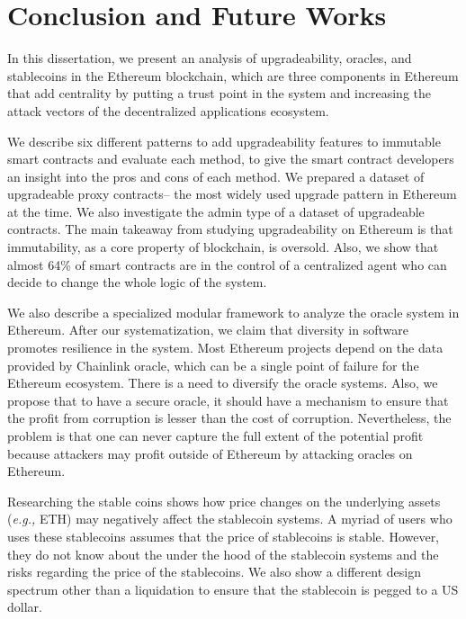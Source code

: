 \documentclass[letterpaper,12pt,onecolumn,final]{report}
\newcommand{\eg}{\textit{e.g.,}\xspace}
\begin{document}









\chapter{Conclusion and Future Works}
\label{chap:conclusion}

In this dissertation, we present an analysis of upgradeability, oracles, and stablecoins in the Ethereum blockchain, which are three components in Ethereum that add centrality by putting a trust point in the system and increasing the attack vectors of the decentralized applications ecosystem.

We describe six different patterns to add upgradeability features to immutable smart contracts and evaluate each method, to give the smart contract developers an insight into the pros and cons of each method. We prepared a dataset of upgradeable proxy contracts-- the most widely used upgrade pattern in Ethereum at the time. We also investigate the admin type of a dataset of upgradeable contracts. The main takeaway from studying upgradeability on Ethereum is that immutability, as a core property of blockchain, is oversold. Also, we show that almost 64\% of smart contracts are in the control of a centralized agent who can decide to change the whole logic of the system.

We also describe a specialized modular framework to analyze the oracle system in Ethereum. After our systematization, we claim that diversity in software promotes resilience in the system. Most Ethereum projects depend on the data provided by Chainlink oracle, which can be a single point of failure for the Ethereum ecosystem. There is a need to diversify the oracle systems. Also, we propose that to have a secure oracle, it should have a mechanism to ensure that the profit from corruption is lesser than the cost of corruption. Nevertheless, the problem is that one can never capture the full extent of the potential profit because attackers may profit outside of Ethereum by attacking oracles on Ethereum. 

Researching the stable coins shows how price changes on the underlying assets (\eg ETH) may negatively affect the stablecoin systems. A myriad of users who uses these stablecoins assumes that the price of stablecoins is stable. However, they do not know about the under the hood of the stablecoin systems and the risks regarding the price of the stablecoins. We also show a different design spectrum other than a liquidation to ensure that the stablecoin is pegged to a US dollar.
\end{document}
